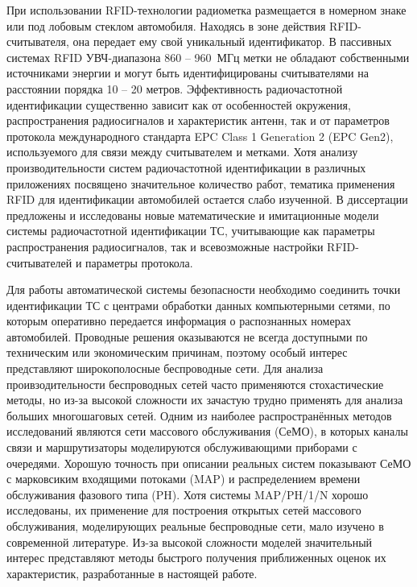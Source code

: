 При использовании RFID-технологии радиометка размещается в номерном знаке или под лобовым стеклом автомобиля. Находясь в зоне действия RFID-считывателя, она передает ему свой уникальный идентификатор. В пассивных системах RFID УВЧ-диапазона 860 -- 960~МГц метки не обладают собственными источниками энергии и могут быть идентифицированы считывателями на расстоянии порядка 10 -- 20 метров. Эффективность радиочастотной идентификации существенно зависит как от особенностей окружения, распространения радиосигналов и характеристик антенн, так и от параметров протокола международного стандарта EPC Class 1 Generation 2 (EPC Gen2), используемого для связи между считывателем и метками. Хотя анализу производительности систем радиочастотной идентификации в различных приложениях посвящено значительное количество работ, тематика применения RFID для идентификации автомобилей остается слабо изученной. В диссертации предложены и исследованы новые математические и имитационные модели системы радиочастотной идентификации ТС, учитывающие как параметры распространения радиосигналов, так и всевозможные настройки RFID-считывателей и параметры протокола.

Для работы автоматической системы безопасности необходимо соединить точки идентификации ТС с центрами обработки данных компьютерными сетями, по которым оперативно передается информация о распознанных номерах автомобилей. Проводные решения оказываются не всегда доступными по техническим или экономическим причинам, поэтому особый интерес представляют широкополосные беспроводные сети. Для анализа проивзодительности беспроводных сетей часто применяются стохастические методы, но из-за высокой сложности их зачастую трудно применять для анализа больших многошаговых сетей. Одним из наиболее распространённых методов исследований являются сети массового обслуживания (СеМО), в которых каналы связи и маршрутизаторы моделируются обслуживающими приборами с очередями. Хорошую точность при описании реальных систем показывают СеМО с марковсиким входящими потоками (MAP) и распределением времени обслуживания фазового типа (PH). Хотя системы MAP/PH/1/N хорошо исследованы, их применение для построения открытых сетей массового обслуживания, моделирующих реальные беспроводные сети, мало изучено в современной литературе. Из-за высокой сложности моделей значительный интерес представляют методы быстрого получения приближенных оценок их характеристик, разработанные в настоящей работе.


